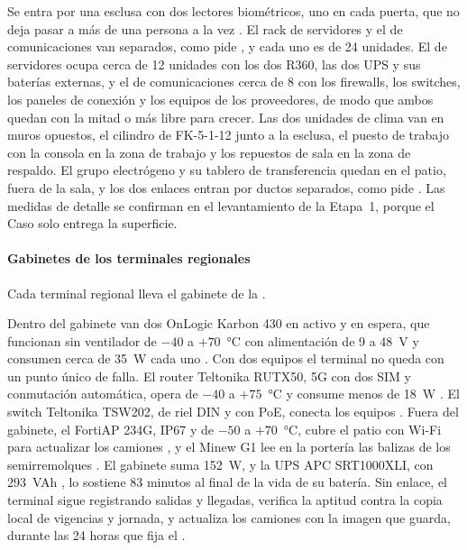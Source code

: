 
Se entra por una esclusa con dos lectores biométricos, uno en cada puerta, que no deja pasar a más de
una persona a la vez . El rack de servidores y el de comunicaciones van separados,
como pide , y cada uno es de 24 unidades. El de servidores ocupa cerca de 12
unidades con los dos R360, las dos UPS y sus baterías externas, y el de comunicaciones cerca de 8 con
los firewalls, los switches, los paneles de conexión y los equipos de los proveedores, de modo que ambos
quedan con la mitad o más libre para crecer. Las dos unidades de clima van en muros opuestos, el cilindro
de FK-5-1-12 junto a la esclusa, el puesto de trabajo con la consola en la zona de trabajo y los
repuestos de sala en la zona de respaldo. El grupo electrógeno y su tablero de transferencia quedan en
el patio, fuera de la sala, y los dos enlaces entran por ductos separados, como pide
. Las medidas de detalle se confirman en el levantamiento de la Etapa~1, porque el
Caso solo entrega la superficie.

\paragraph{Gabinetes de los terminales regionales} Cada terminal regional lleva el gabinete de la
.


Dentro del gabinete van dos OnLogic Karbon 430 en activo y en espera, que funcionan sin ventilador de
$-40$ a $+70$~°C con alimentación de 9 a 48~V y consumen cerca de 35~W cada uno \parencite{onlogic_k430}.
Con dos equipos el terminal no queda con un punto único de falla. El router Teltonika RUTX50, 5G con dos
SIM y conmutación automática, opera de $-40$ a $+75$~°C y consume menos de 18~W
\parencite{teltonika_rutx50}. El switch Teltonika TSW202, de riel DIN y con PoE, conecta los equipos
\parencite{teltonika_tsw202}. Fuera del gabinete, el FortiAP 234G, IP67 y de $-50$ a $+70$~°C, cubre el
patio con Wi-Fi para actualizar los camiones \parencite{fortinet_fap}, y el Minew G1 lee en la portería
las balizas de los semirremolques \parencite{minew_g1}. El gabinete suma 152~W, y la UPS APC SRT1000XLI,
con 293~VAh \parencite{apc_srt1000}, lo sostiene 83 minutos al final de la vida de su batería. Sin enlace,
el terminal sigue registrando salidas y llegadas, verifica la aptitud contra la copia local de vigencias
y jornada, y actualiza los camiones con la imagen que guarda, durante las 24 horas que fija el
.

